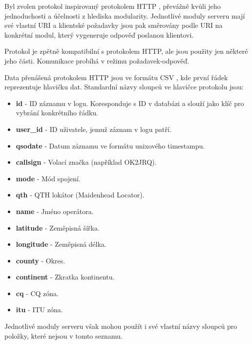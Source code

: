 Byl zvolen protokol inspirovaný protokolem HTTP \cite{http}, převážně kvůli jeho jednoduchosti a účelnosti z hlediska modularity.
Jednotlivé moduly serveru mají své vlastní URI a klientské požadavky jsou pak směrovány podle URI na konkrétní modul,
který vygeneruje odpověď poslanou klientovi.

Protokol je zpětně kompatibilní s protokolem HTTP, %
ale jsou použity jen některé jeho části. Komunikace probíhá v režimu
požadavek-odpověď.

Data přenášená protokolem HTTP jsou ve formátu CSV \cite{csv}, kde první řádek reprezentuje hlavičku dat. Standardní názvy
sloupců ve hlavičce protokolu jsou:
\begin{itemize}
\item \textbf{id} - ID záznamu v logu. Koresponduje s ID v databázi a slouží jako klíč pro vybrání konkrétního řádku.
\item \textbf{user\_id} - ID uživatele, jemuž záznam v logu patří.
\item \textbf{qsodate} - Datum záznamu ve formátu unixového timestampu.
\item \textbf{callsign} - Volací značka (například OK2JRQ).
\item \textbf{mode} - Mód spojení. %
\item \textbf{qth} - QTH lokátor (Maidenhead Locator).%
\item \textbf{name} - Jméno operátora.
\item \textbf{latitude} - Zeměpisná šířka.
\item \textbf{longitude} - Zeměpisná délka.
\item \textbf{county} - Okres.
\item \textbf{continent} - Zkratka kontinentu.
\item \textbf{cq} - CQ zóna.
\item \textbf{itu} - ITU zóna.
\end{itemize}

Jednotlivé moduly serveru však mohou použít i své vlastní názvy sloupců pro položky, které nejsou v tomto seznamu.
